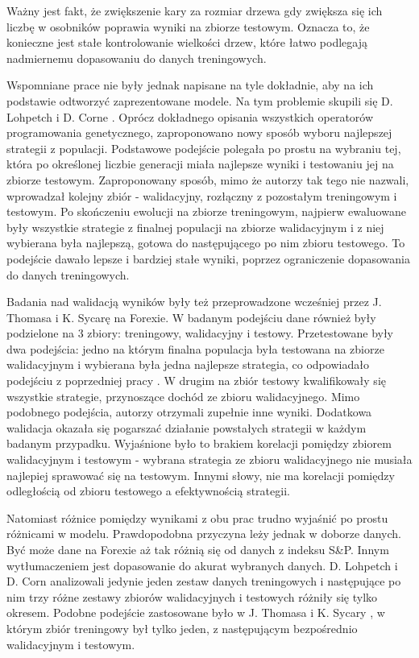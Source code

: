 \documentclass[twoside]{iisthesis}
\begin{document}
Ważny jest fakt, że zwiększenie kary za rozmiar drzewa gdy zwiększa się ich liczbę w osobników poprawia wyniki na zbiorze testowym. Oznacza to, że konieczne jest stałe kontrolowanie wielkości drzew, które łatwo podlegają nadmiernemu dopasowaniu do danych treningowych.

Wspomniane prace nie były jednak napisane na tyle dokładnie, aby na ich podstawie odtworzyć zaprezentowane modele. Na tym problemie skupili się D. Lohpetch i D. Corne \cite{5393324}. Oprócz dokładnego opisania wszystkich operatorów programowania genetycznego, zaproponowano nowy sposób wyboru najlepszej strategii z populacji. Podstawowe podejście polegała po prostu na wybraniu tej, która po określonej liczbie generacji miała najlepsze wyniki i testowaniu jej na zbiorze testowym. Zaproponowany sposób, mimo że autorzy tak tego nie nazwali, wprowadzał kolejny zbiór - walidacyjny, rozłączny z pozostałym treningowym i testowym. Po skończeniu ewolucji na zbiorze treningowym, najpierw ewaluowane były wszystkie strategie z finalnej populacji na zbiorze walidacyjnym i z niej wybierana była najlepszą, gotowa do następującego po nim zbioru testowego. To podejście dawało lepsze i bardziej stałe wyniki, poprzez ograniczenie dopasowania do danych treningowych.

Badania nad walidacją wyników były też przeprowadzone wcześniej przez J. Thomasa i K. Sycarę \cite{Thomas1999TheIO} na Forexie.  W badanym podejściu dane również były podzielone na 3 zbiory: treningowy, walidacyjny i testowy. Przetestowane były dwa podejścia: jedno na którym finalna populacja była testowana na zbiorze walidacyjnym i wybierana była jedna najlepsze strategia, co odpowiadało podejściu z poprzedniej pracy \cite{5393324}. W drugim na zbiór testowy kwalifikowały się wszystkie strategie, przynoszące dochód ze zbioru walidacyjnego. Mimo podobnego podejścia, autorzy otrzymali zupełnie inne wyniki. Dodatkowa walidacja okazała się pogarszać działanie powstałych strategii w każdym badanym przypadku. Wyjaśnione było to brakiem korelacji pomiędzy zbiorem walidacyjnym i testowym - wybrana strategia ze zbioru walidacyjnego nie musiała najlepiej sprawować się na testowym. Innymi słowy, nie ma korelacji pomiędzy odległością od zbioru testowego a efektywnością strategii.

Natomiast różnice pomiędzy wynikami z obu prac trudno wyjaśnić po prostu różnicami w modelu. Prawdopodobna przyczyna leży jednak w doborze danych. Być może dane na Forexie aż tak różnią się od danych z indeksu S\&P. Innym wytłumaczeniem jest dopasowanie do akurat wybranych danych. D. Lohpetch i D. Corn \cite{5393324} analizowali jedynie jeden zestaw danych treningowych i następujące po nim trzy różne zestawy zbiorów walidacyjnych i testowych różniły się tylko okresem. Podobne podejście zastosowane było w J. Thomasa i K. Sycary \cite{Thomas1999TheIO}, w którym zbiór treningowy był tylko jeden, z następującym bezpośrednio walidacyjnym i testowym.
\end{document}
